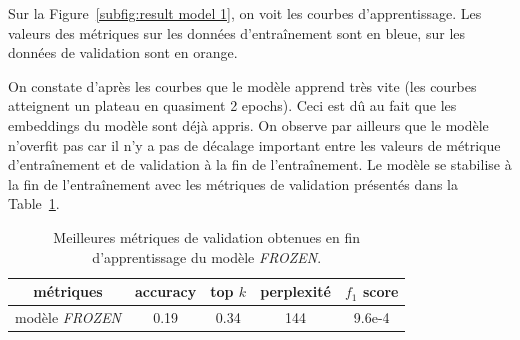 \documentclass[a4paper]{article}
\begin{document}
Sur la Figure~\ref{subfig:result model 1}, on voit les courbes d'apprentissage. Les valeurs des métriques sur les données 
d'entraînement sont en bleue, sur les données de validation sont en orange.

On constate d'après les courbes que le modèle apprend très vite (les courbes atteignent un plateau en quasiment 2 epochs). Ceci 
est dû au fait que les embeddings du modèle sont déjà appris. On observe par ailleurs que le modèle n'overfit pas car il n'y a pas 
de décalage important entre les valeurs de métrique d'entraînement et de validation à la fin de l'entraînement. Le modèle se 
stabilise à la fin de l'entraînement avec les métriques de validation présentés dans la Table~\ref{tab:metriques model1}.


\begin{table}[ht]
    \centering
    \begin{tabular}{|c|c|c|c|c|}
        \hline
        métriques & accuracy  & top $k$  & perplexité  & $f_1$ score \\
        \hline
        modèle \textit{FROZEN} & 0.19 & 0.34  & 144 & 9.6e-4 \\
        \hline
    \end{tabular}
    \caption{Meilleures métriques de validation obtenues en fin d'apprentissage du modèle \textit{FROZEN}.}
    \label{tab:metriques model1}
\end{table}
\end{document}
